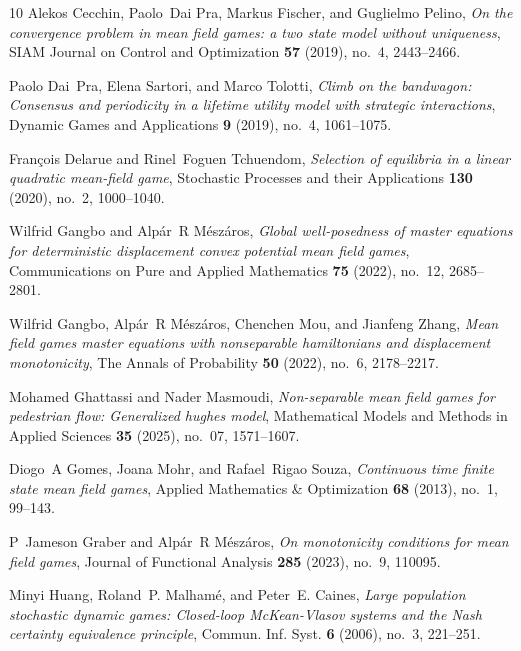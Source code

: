 \documentclass[11pt,a4paper]{amsart}
\theoremstyle{definition}
\begin{document}
\begin{thebibliography}{10}
	Alekos Cecchin, Paolo~Dai Pra, Markus Fischer, and Guglielmo Pelino, \emph{On
		the convergence problem in mean field games: a two state model without
		uniqueness}, SIAM Journal on Control and Optimization \textbf{57} (2019),
	no.~4, 2443--2466.
	
	Paolo Dai~Pra, Elena Sartori, and Marco Tolotti, \emph{Climb on the bandwagon:
		Consensus and periodicity in a lifetime utility model with strategic
		interactions}, Dynamic Games and Applications \textbf{9} (2019), no.~4,
	1061--1075.
	
	Fran{\c{c}}ois Delarue and Rinel~Foguen Tchuendom, \emph{Selection of
		equilibria in a linear quadratic mean-field game}, Stochastic Processes and
	their Applications \textbf{130} (2020), no.~2, 1000--1040.
	
	Wilfrid Gangbo and Alp{\'a}r~R M{\'e}sz{\'a}ros, \emph{Global well-posedness of
		master equations for deterministic displacement convex potential mean field
		games}, Communications on Pure and Applied Mathematics \textbf{75} (2022),
	no.~12, 2685--2801.
	
	Wilfrid Gangbo, Alp{\'a}r~R M{\'e}sz{\'a}ros, Chenchen Mou, and Jianfeng Zhang,
	\emph{Mean field games master equations with nonseparable hamiltonians and
		displacement monotonicity}, The Annals of Probability \textbf{50} (2022),
	no.~6, 2178--2217.
	
	Mohamed Ghattassi and Nader Masmoudi, \emph{Non-separable mean field games for
		pedestrian flow: Generalized hughes model}, Mathematical Models and Methods
	in Applied Sciences \textbf{35} (2025), no.~07, 1571--1607.
	
	Diogo~A Gomes, Joana Mohr, and Rafael~Rigao Souza, \emph{Continuous time finite
		state mean field games}, Applied Mathematics \& Optimization \textbf{68}
	(2013), no.~1, 99--143.
	
	P~Jameson Graber and Alp{\'a}r~R M{\'e}sz{\'a}ros, \emph{On monotonicity
		conditions for mean field games}, Journal of Functional Analysis \textbf{285}
	(2023), no.~9, 110095.
	
	Minyi Huang, Roland~P. Malham{\'e}, and Peter~E. Caines, \emph{{Large
			population stochastic dynamic games: Closed-loop {M}c{K}ean-{V}lasov systems
			and the {N}ash certainty equivalence principle}}, Commun. Inf. Syst.
	\textbf{6} (2006), no.~3, 221--251. 
	

\end{thebibliography}
\end{document}

